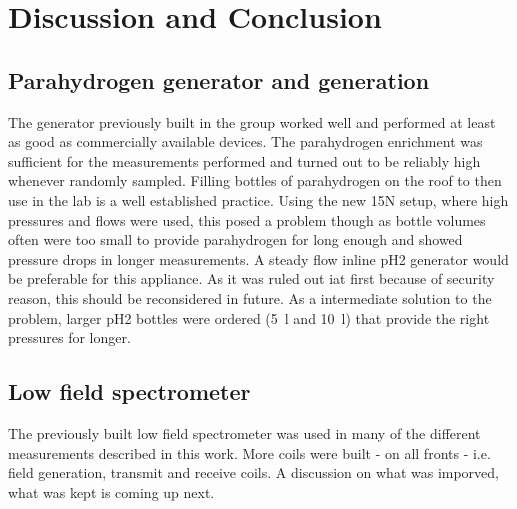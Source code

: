 \chapter{Discussion and Conclusion}
    \label{chap:conclusion}
    \section{Parahydrogen generator and generation}
        The generator previously built in the group worked well and performed at least as good as commercially available devices. The parahydrogen enrichment was sufficient for the measurements performed and turned out to be reliably high whenever randomly sampled.
        Filling bottles of parahydrogen on the roof to then use in the lab is a well established practice. Using the new 15N setup, where high pressures and flows were used, this posed a problem though as bottle volumes often were too small to provide parahydrogen for long enough and showed pressure drops in longer measurements. A steady flow inline pH2 generator would be preferable for this appliance. As it was ruled out iat first because of security reason, this should be reconsidered in future. As a intermediate solution to the problem, larger pH2 bottles were ordered (\SI{5}{\l} and \SI{10}{\l}) that provide the right pressures for longer.
    \section{Low field spectrometer}
        The previously built low field spectrometer was used in many of the different measurements described in this work. More coils were built - on all fronts - i.e. field generation, transmit and receive coils. A discussion on what was imporved, what was kept is coming up next.
